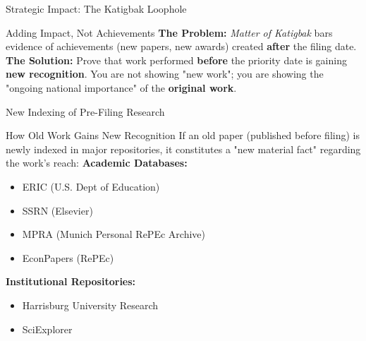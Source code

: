 \documentclass[11pt]{beamer}
\begin{document}
	
	
	\begin{frame}{Strategic Impact: The Katigbak Loophole}
		\scriptsize
		\begin{block}{Adding Impact, Not Achievements}
			\textbf{The Problem:} \textit{Matter of Katigbak} bars evidence of achievements (new papers, new awards) created \textbf{after} the filing date.
			\vspace{0.1cm}
			\textbf{The Solution:} Prove that work performed \textbf{before} the priority date is gaining \textbf{new recognition}. You are not showing "new work"; you are showing the "ongoing national importance" of the \textbf{original work}.
		\end{block}
	\end{frame}
	
	
	
	\begin{frame}{New Indexing of Pre-Filing Research}
		\scriptsize
		\begin{block}{How Old Work Gains New Recognition}
			If an old paper (published before filing) is newly indexed in major repositories, it constitutes a "new material fact" regarding the work's reach:
			\vspace{0.1cm}
			\textbf{Academic Databases:}
			\begin{itemize}
				\item ERIC (U.S. Dept of Education)
				\item SSRN (Elsevier)
				\item MPRA (Munich Personal RePEc Archive)
				\item EconPapers (RePEc)
			\end{itemize}
			\textbf{Institutional Repositories:}
			\begin{itemize}
				\item Harrisburg University Research
				\item SciExplorer

			\end{itemize}
		\end{block}
	\end{frame}
	
\end{document}
